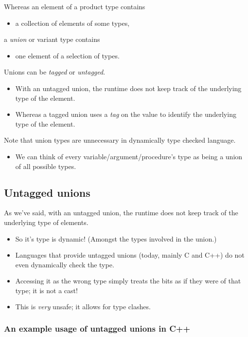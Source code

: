 \documentclass[11pt]{article}
\theoremstyle{definition}
\begin{document}
Whereas an element of a product type contains
\begin{itemize}
\item a collection of elements of some types,
\end{itemize}
a \emph{union} or variant type contains
\begin{itemize}
\item one element of a selection of types.
\end{itemize}

Unions can be \emph{tagged} or \emph{untagged}.
\begin{itemize}
\item With an untagged union, the runtime does not
keep track of the underlying type of the element.
\item Whereas a tagged union uses a \emph{tag} on the value to identify
the underlying type of the element.
\end{itemize}

Note that union types are unnecessary
in dynamically type checked language.
\begin{itemize}
\item We can think of every variable/argument/procedure's type
as being a union of all possible types.
\end{itemize}

\subsection{Untagged unions}
\label{sec:org9b57c02}

As we've said, with an untagged union,
the runtime does not keep track of the underlying type of elements.
\begin{itemize}
\item So it's type is dynamic! (Amongst the types involved in the union.)
\item Languages that provide untagged unions (today, mainly C and C++)
do not even dynamically check the type.
\item Accessing it as the wrong type simply treats the bits
as if they were of that type; it is not a cast!
\item This is \emph{very} unsafe; it allows for type clashes.
\end{itemize}

\subsubsection{An example usage of untagged unions in C++}
\label{sec:org213c0c3}
\end{document}
